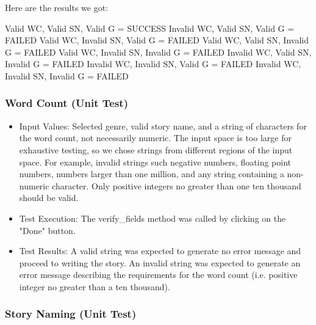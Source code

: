 \documentclass[12pt]{article}
\begin{document}
Here are the results we got:\newline

Valid WC, Valid SN, Valid G = SUCCESS\newline
Invalid WC, Valid SN, Valid G = FAILED\newline
Valid WC, Invalid SN, Valid G = FAILED\newline
Valid WC, Valid SN, Invalid G = FAILED\newline
Valid WC, Invalid SN, Invalid G = FAILED\newline
Invalid WC, Valid SN, Invalid G = FAILED\newline
Invalid WC, Invalid SN, Valid G = FAILED\newline
Invalid WC, Invalid SN, Invalid G = FAILED\newline

\subsubsection{Word Count (Unit Test)}
\begin{itemize}
\item Input Values: Selected genre, valid story name, and a string of characters for the word count, not necessarily numeric. The input space is too large for exhaustive testing, so we chose strings from different regions of the input space. For example, invalid strings such negative numbers, floating point numbers, numbers larger than one million, and any string containing a non-numeric character. Only positive integers no greater than one ten thousand should be valid.
\item Test Execution: The verify\_fields method was called by clicking on the "Done" button.
\item Test Results: A valid string was expected to generate no error message and proceed to writing the story. An invalid string was expected to generate an error message describing the requirements for the word count (i.e. positive integer no greater than a ten thousand).
\end{itemize}

\subsubsection{Story Naming (Unit Test)}
\end{document}
